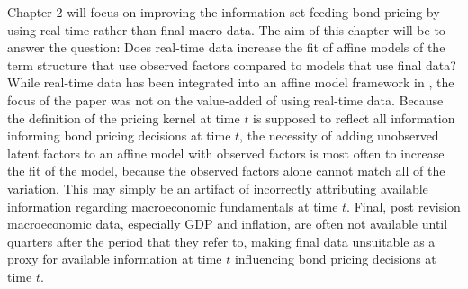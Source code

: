 \documentclass{article}
\numberwithin{equation}{section}
\begin{document}
Chapter 2 will focus on improving the information set feeding bond pricing by
using real-time rather than final macro-data. The aim of this chapter will be
to answer the question: Does real-time data increase the fit of affine models
of the term structure that use observed factors compared to models that use
final data? While real-time data has been integrated into an affine model
framework in \citet{orphanideswei2010}, the focus of the paper was not on the
value-added of using real-time data. Because the definition of the pricing
kernel at time $t$ is supposed to reflect all information informing bond
pricing decisions at time $t$, the necessity of adding unobserved latent
factors to an affine model with observed factors is most often to increase the
fit of the model, because the observed factors alone cannot match all of the
variation. This may simply be an artifact of incorrectly attributing available
information regarding macroeconomic fundamentals at time $t$. Final, post
revision macroeconomic data, especially GDP and inflation, are often not
available until quarters after the period that they refer to, making final data
unsuitable as a proxy for available information at time $t$ influencing bond
pricing decisions at time $t$.
\end{document}
